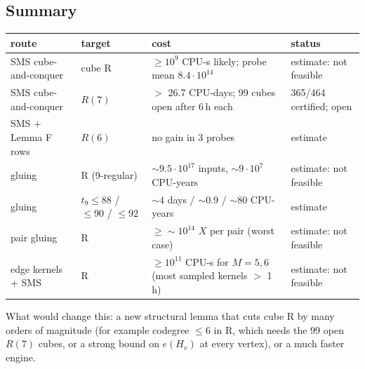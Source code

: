 \subsection{Summary}\label{sec:hard-summary}
\begin{center}\footnotesize
\begin{tabular}{@{}p{2.6cm} p{2.4cm} p{5.4cm} p{3.6cm}@{}}
\toprule
route & target & cost & status \\
\midrule
SMS cube-and-conquer & cube R & $\ge 10^{9}$ CPU-s likely; probe mean $8.4\cdot 10^{14}$ & estimate: not feasible \\
SMS cube-and-conquer & $R(7)$ & $>$ 26.7 CPU-days; 99 cubes open after 6\,h each & 365/464 certified; open \\
SMS + Lemma F rows & $R(6)$ & no gain in 3 probes & estimate \\
gluing & R (9-regular) & ${\sim}9.5\cdot 10^{17}$ inputs, ${\sim}9\cdot 10^{7}$ CPU-years & estimate: not feasible \\
gluing & $t_9 \le 88$ / $\le 90$ / $\le 92$ & ${\sim}4$ days / ${\sim}0.9$ / ${\sim}80$ CPU-years & estimate \\
pair gluing & R & $\ge {\sim}10^{14}$ $X$ per pair (worst case) & estimate: not feasible \\
edge kernels + SMS & R & $\ge 10^{11}$ CPU-s for $M = 5, 6$ (most sampled kernels $>$ 1\,h) & estimate: not feasible \\
\bottomrule
\end{tabular}
\end{center}

What would change this: a new structural lemma that cuts cube R by many orders of magnitude (for example
codegree $\le 6$ in R, which needs the 99 open $R(7)$ cubes, or a strong bound on $e(H_v)$ at every vertex), or a
much faster engine.
